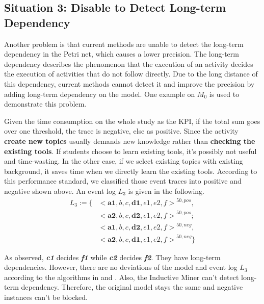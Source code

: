 \subsection{Situation 3: \small{Disable to Detect Long-term Dependency}}
Another problem is that current methods are unable to detect the long-term dependency in the Petri net, which causes a lower precision. The long-term dependency describes the phenomenon that the execution of an activity decides the execution of activities that do not follow directly. Due to the long distance of this dependency, current methods cannot detect it and improve the precision by adding long-term dependency on the model. One example  on $M_0$ is used to demonstrate this problem.
 

Given the time consumption on the whole study as the KPI, if the total sum goes over one threshold, the trace is negative, else as positive. Since the activity \textbf{create new topics} usually demands new knowledge rather than \textbf{checking the existing tools}. If students choose to learn existing tools, it's possibly not useful and time-wasting. In the other case, if we select existing topics with existing background, it saves time when we directly learn the existing tools. According to this performance standard, we classified those event traces into positive and negative shown above.
An event log $L_3$ is given in the following. 
\begin{align*}
L_3:= \{ & { <\textbf{a1}, b, c, \textbf{d1}, e1, e2, f >}^{50, pos}, \\  
 &{<\textbf{a2}, b, c, \textbf{d2}, e1, e2, f >}^{50, pos} ; \\
& {<\textbf{a1}, b, c, \textbf{d2}, e1, e2, f >}^{50, neg}, \\
& {<\textbf{a2}, b, c, \textbf{d1}, e1, e2, f >}^{50, neg}  \}
\end{align*}

As observed, \textbf{\emph{c1}} decides \textbf{\emph{f1}} while \textbf{\emph{c2}} decides \textbf{\emph{f2}}. They have long-term dependencies.
However, there are no deviations of the model and event log $L_3$ according to the  algorithms in  \cite{fahland2015model} and  \cite{dees2017enhancing}. Also, the Inductive Miner can't detect long-term dependency. Therefore, the original model stays the same and negative instances can't be blocked.

